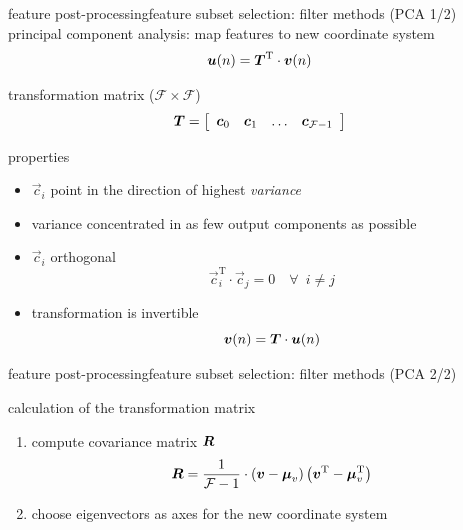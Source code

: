 		\begin{frame}{feature post-processing}{feature subset selection: filter methods (PCA 1/2)}
			principal component analysis: map features to new coordinate system 
			\begin{equation}\label{eq:pca_an}
				\vec{u}(n) = \mat{T}^\mathrm{T}\cdot\vec{v}(n) 
			\end{equation}

			\pause
			transformation matrix ($\mathcal{F}\times\mathcal{F}$)	
			\begin{equation}
				\mat{T} =   \left[ 
					  			\begin{array}{cccc}
								\vec{c}_0 & \vec{c}_1 & \ldots & \vec{c}_{\mathcal{F}-1}\\
								\end{array}  
							\right] 
			\end{equation}

			\pause
			properties
			\begin{itemize}
			\item	$\vec{c}_i$ point in the direction of  highest \emph{variance}
			\pause
			\item	variance concentrated in as few output components as possible
			\pause
			\item	$\vec{c}_i$ orthogonal
					\begin{equation}
						\vec{c}_i^\mathrm{T}\cdot \vec{c}_j = 0\quad \forall\enspace i \neq j
					\end{equation}
			\item	transformation is invertible
					\begin{equation}\label{eq:pca_syn}
						\vec{v}(n) = \mat{T}\cdot\vec{u}(n)
					\end{equation}
			\end{itemize}
		\end{frame}
		\begin{frame}{feature post-processing}{feature subset selection: filter methods (PCA 2/2)}
			
			\vspace{-5mm}
			\pause
			calculation of the transformation matrix
			\begin{enumerate}
				\item	compute covariance matrix $\mat{R}$
					\begin{equation}
						\mat{R} = \frac{1}{\mathcal{F}-1}\cdot \left(\vec{v} - \vec{\mu}_v\right)\left(\vec{v}^\mathrm{T} - \vec{\mu}^\mathrm{T}_v\right)
					\end{equation}
				\item	choose eigenvectors as axes for the new coordinate system
			\end{enumerate}
		\end{frame}


